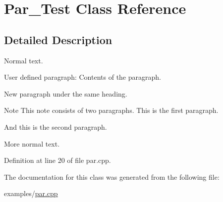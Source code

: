 \hypertarget{class_par___test}{}\section{Par\+\_\+\+Test Class Reference}
\label{class_par___test}


\subsection{Detailed Description}
Normal text.

\begin{DoxyParagraph}{User defined paragraph\+:}
Contents of the paragraph.
\end{DoxyParagraph}
\begin{DoxyParagraph}{}
New paragraph under the same heading.
\end{DoxyParagraph}
\begin{DoxyNote}{Note}
This note consists of two paragraphs. This is the first paragraph.
\end{DoxyNote}
\begin{DoxyParagraph}{}
And this is the second paragraph.
\end{DoxyParagraph}
More normal text. 

Definition at line 20 of file par.\+cpp.



The documentation for this class was generated from the following file\+:\begin{DoxyCompactItemize}
\item 
examples/\hyperlink{par_8cpp}{par.\+cpp}\end{DoxyCompactItemize}
